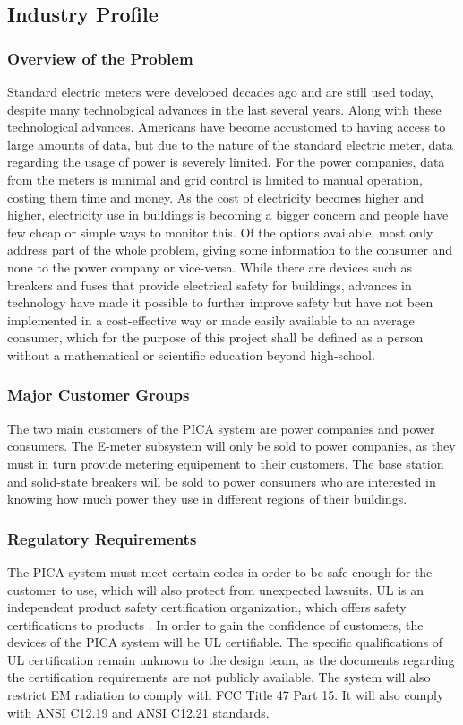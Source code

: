 \subsection{Industry Profile}
\subsubsection{Overview of the Problem}
Standard electric meters were developed decades ago and are still used today, despite many technological advances in the last several years. Along with these technological advances, Americans have become accustomed to having access to large amounts of data, but due to the nature of the standard electric meter, data regarding the usage of power is severely limited. For the power companies, data from the meters is minimal and grid control is limited to manual operation, costing them time and money.
As the cost of electricity becomes higher and higher, electricity use in buildings is becoming a bigger concern and people have few cheap or simple ways to monitor this. Of the options available, most only address part of the whole problem, giving some information to the consumer and none to the power company or vice-versa. While there are devices such as breakers and fuses that provide electrical safety for buildings, advances in technology have made it possible to further improve safety but have not been implemented in a cost-effective way or made easily available to an average consumer, which for the purpose of this project shall be defined as a person without a mathematical or scientific education beyond high-school.

\subsubsection{Major Customer Groups}
The two main customers of the PICA system are power companies and power consumers. The E-meter subsystem will only be sold to power companies, as they must in turn provide metering equipement to their customers. The base station and solid-state breakers will be sold to power consumers who are interested in knowing how much power they use in different regions of their buildings.

\subsubsection{Regulatory Requirements} %
The PICA system must meet certain codes in order to be safe enough for the customer to use, which will also protect from unexpected lawsuits. \ac{UL} is an independent product safety certification organization, which offers safety certifications to products \cite{UL_Web}. In order to gain the confidence of customers, the devices of the PICA system will be UL certifiable. The specific qualifications of \ac{UL} certification remain unknown to the design team, as the documents regarding the certification requirements are not publicly available. The system will also restrict \ac{EM} radiation to comply with \ac{FCC} Title 47 Part 15. It will also comply with \ac{ANSI} C12.19 and \ac{ANSI} C12.21 standards.


